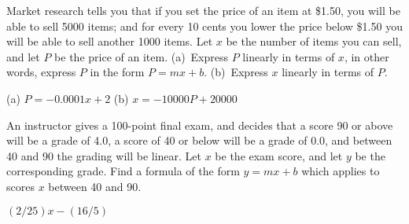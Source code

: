 \begin{exercises}
\begin{exercise}
Market research tells you that if you set the price of an item at
\$1.50, you will be able to sell 5000 items; and for every 10 cents you
lower the price below \$1.50 you will be able to sell another 1000 items.
Let $x$ be the number of items you can sell, and let $P$ be the price of
an item.  (a)~Express $P$ linearly in terms of $x$, in other words,
express $P$ in the form $P=mx+b$.  (b)~Express $x$
linearly in terms of $P$.
\begin{answer} (a) $P=-0.0001x+2$
(b) $x=-10000P+20000$
\end{answer}\end{exercise}

\begin{exercise}
An instructor gives a 100-point final exam, and decides that a score
90 or above will be a grade of 4.0, a score of 40 or below will be a grade
of 0.0, and between 40 and 90 the grading will be linear.  Let $x$ be
the exam score, and let $y$ be the corresponding grade.  Find a formula
of the form $y=mx+b$ which applies to scores $x$ between 40 and 90.
\begin{answer} $(2/25)x-(16/5)$
\end{answer}\end{exercise}

\end{exercises}


